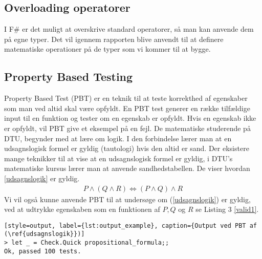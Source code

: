 \subsection{Overloading operatorer}
I F\# er det muligt at overskrive standard operatorer, så man kan anvende dem på egne typer. Det vil igennem rapporten blive anvendt til at definere matematiske operationer på de typer som vi kommer til at bygge.

\subsection{Property Based Testing}
Property Based Test (PBT) er en teknik til at teste korrekthed af egenskaber som man ved altid skal være opfyldt. En PBT test generer en række tilfældige input til en funktion og tester om en egenskab er opfyldt. Hvis en egenskab ikke er opfyldt, vil PBT give et eksempel på en fejl. De matematiske studerende på DTU, begynder med at lære om logik. I den forbindelse lærer man at en udsagnslogisk formel er gyldig (tautologi) hvis den altid er sand. Der eksistere mange teknikker til at vise at en udsagnslogisk formel er gyldig, i DTU's matematiske kursus lærer man at anvende sandhedstabellen. De viser hvordan \ref{udsagnslogik} er gyldig. 
\begin{gather}
    P \land (Q \land R) \iff (P \land Q) \land R
    \label{udsagnslogik}
\end{gather}
Vi vil også kunne anvende PBT til at undersøge om (\ref{udsagnslogik}) er gyldig, ved at udtrykke egenskaben som en funktionen af $P, Q$ og $R$ se Listing 3 \ref{valid1}.



\begin{lstlisting}[style=output, label={lst:output_example}, caption={Output ved PBT af (\ref{udsagnslogik}})]
> let _ = Check.Quick propositional_formula;;
Ok, passed 100 tests.
\end{lstlisting}

